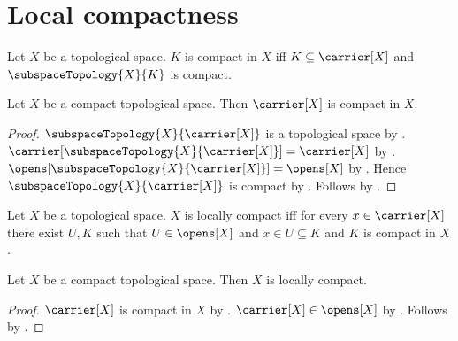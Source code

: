 \section{Local compactness}





\begin{definition}\label{compact_in}
    Let $X$ be a topological space.
    $K$ is compact in $X$ iff
        $K\subseteq\carrier[X]$ and
        $\subspaceTopology{X}{K}$ is compact.
\end{definition}

\begin{theorem}\label{compact_space_carrier_is_compact}
    Let $X$ be a compact topological space.
    Then $\carrier[X]$ is compact in $X$.
\end{theorem}
\begin{proof}
    $\subspaceTopology{X}{\carrier[X]}$ is a topological space by
        .
    $\carrier[\subspaceTopology{X}{\carrier[X]}]=\carrier[X]$ by
        .
    $\opens[\subspaceTopology{X}{\carrier[X]}]=\opens[X]$ by
        .
    Hence $\subspaceTopology{X}{\carrier[X]}$ is compact by
        .
    Follows by .
\end{proof}

\begin{definition}\label{is_locally_compact}
    Let $X$ be a topological space.
    $X$ is locally compact iff
        for every $x\in\carrier[X]$ there exist $U,K$ such that
            $U\in\opens[X]$ and $x\in U\subseteq K$ and
            $K$ is compact in $X$.
\end{definition}

\begin{theorem}\label{compact_space_is_locally_compact}
    Let $X$ be a compact topological space.
    Then $X$ is locally compact.
\end{theorem}
\begin{proof}
    $\carrier[X]$ is compact in $X$ by .
    $\carrier[X]\in\opens[X]$ by .
    Follows by .
\end{proof}

